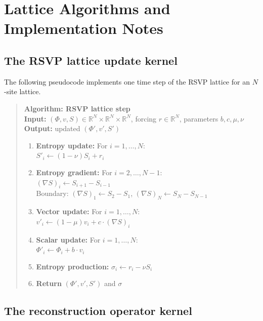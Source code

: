 \documentclass[12pt, oneside]{memoir}
\begin{document}
\chapter{Lattice Algorithms and Implementation Notes}
\label{app:algorithms}

\section{The RSVP lattice update kernel}

The following pseudocode implements one time step of the RSVP lattice
 for an $N$-site lattice.

\medskip
\begin{quote}
\textbf{Algorithm: RSVP lattice step}\\
\textbf{Input:} $(\Phi, v, S) \in \mathbb{R}^N \times \mathbb{R}^N \times \mathbb{R}^N$,
forcing $r \in \mathbb{R}^N$, parameters $b, c, \mu, \nu$\\
\textbf{Output:} updated $(\Phi', v', S')$
\begin{enumerate}
  \item \textbf{Entropy update:} For $i = 1, \dots, N$:\\
        $S'_i \leftarrow (1-\nu) S_i + r_i$
  \item \textbf{Entropy gradient:} For $i = 2, \dots, N-1$:\\
        $(\nabla S)_i \leftarrow S_{i+1} - S_{i-1}$\\
        Boundary: $(\nabla S)_1 \leftarrow S_2 - S_1$, $(\nabla S)_N \leftarrow S_N - S_{N-1}$
  \item \textbf{Vector update:} For $i = 1, \dots, N$:\\
        $v'_i \leftarrow (1-\mu) v_i + c \cdot (\nabla S)_i$
  \item \textbf{Scalar update:} For $i = 1, \dots, N$:\\
        $\Phi'_i \leftarrow \Phi_i + b \cdot v_i$
  \item \textbf{Entropy production:} $\sigma_i \leftarrow r_i - \nu S_i$
  \item \textbf{Return} $(\Phi', v', S')$ and $\sigma$
\end{enumerate}
\end{quote}

\section{The reconstruction operator kernel}
\end{document}
